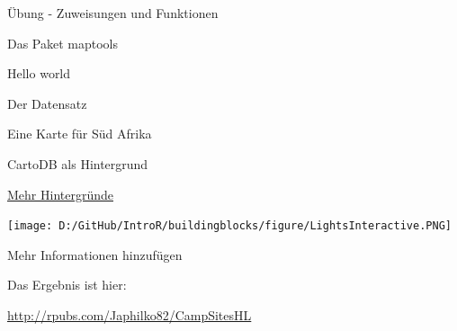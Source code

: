 \documentclass[ignorenonframetext,]{beamer}
\newenvironment{Shaded}{\begin{snugshade}}{\end{snugshade}}
\newcommand{\CharTok}[1]{\textcolor[rgb]{0.02,0.61,0.04}{#1}}
\newcommand{\CommentTok}[1]{\textcolor[rgb]{0.00,0.40,1.00}{\textbf{\textit{#1}}}}
\newcommand{\DataTypeTok}[1]{\textcolor[rgb]{0.74,0.68,0.62}{\underline{#1}}}
\newcommand{\KeywordTok}[1]{\textcolor[rgb]{0.26,0.66,0.93}{\textbf{#1}}}
\newcommand{\NormalTok}[1]{\textcolor[rgb]{0.74,0.68,0.62}{#1}}
\newcommand{\OperatorTok}[1]{\textcolor[rgb]{0.74,0.68,0.62}{#1}}
\newcommand{\StringTok}[1]{\textcolor[rgb]{0.02,0.61,0.04}{#1}}
\begin{document}
\begin{frame}[fragile]{Übung - Zuweisungen und Funktionen}
\begin{frame}[fragile]{Das Paket maptools}
\begin{frame}[fragile]{Hello world}
\begin{frame}[fragile]{Der Datensatz}
\begin{frame}[fragile]{Eine Karte für Süd Afrika}
\begin{frame}[fragile]{CartoDB als Hintergrund}
\end{frame}

\begin{frame}[fragile]{\href{http://leaflet-extras.github.io/leaflet-providers/preview/index.html}{Mehr
Hintergründe}}
\protect\hypertarget{mehr-hintergrunde}{}

\begin{Shaded}
\end{Shaded}

\texttt{[image: D:/GitHub/IntroR/buildingblocks/figure/LightsInteractive.PNG]}

\end{frame}

\begin{frame}[fragile]{Mehr Informationen hinzufügen}
\protect\hypertarget{mehr-informationen-hinzufugen}{}

\begin{Shaded}
\end{Shaded}

\begin{Shaded}
\end{Shaded}

Das Ergebnis ist hier:

\url{http://rpubs.com/Japhilko82/CampSitesHL}

\end{frame}


\end{frame}
\end{frame}
\end{frame}
\end{frame}
\end{frame}
\end{document}
